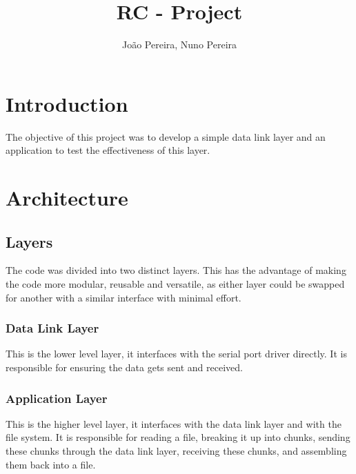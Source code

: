 \documentclass[11pt,a4paper,twocolumn]{article}
\title{RC - \nth{1} Project}
\author{João Pereira, Nuno Pereira}
\begin{document}
\maketitle





\section{Introduction}

The objective of this project was to develop a simple data link layer and an application to test the effectiveness of this layer.

\section{Architecture}

\subsection{Layers}

The code was divided into two distinct layers. This has the advantage of making the code more modular, reusable and versatile, as either layer could be swapped for another with a similar interface with minimal effort.

\subsubsection{Data Link Layer}

This is the lower level layer, it interfaces with the serial port driver directly. It is responsible for ensuring the data gets sent and received.

\subsubsection{Application Layer}

This is the higher level layer, it interfaces with the data link layer and with the file system. It is responsible for reading a file, breaking it up into chunks, sending these chunks through the data link layer, receiving these chunks, and assembling them back into a file.
\end{document}
